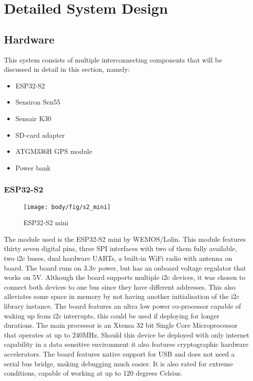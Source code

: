 \chapter{Detailed System Design}
\vspace{-2em}
\section{Hardware}


This system consists of multiple interconnecting components that will be discussed in detail in this section, namely:
\begin{itemize}
	\item ESP32-S2
	\item Sensiron Sen55
	\item Sensair K30
	\item SD-card adapter
	\item ATGM336H GPS module
	\item Power bank	
\end{itemize} 




\subsection{ESP32-S2}

\begin{figure}[!htb]
	\centering
	\texttt{[image: body/fig/s2\_mini]}
	\caption{ESP32-S2 mini}
	\label{fig:s2mini}
\end{figure}


\noindent
The module used is the ESP32-S2 mini by WEMOS/Lolin. This module features thirty seven digital pins, three SPI interfaces with two of them fully available, two i2c buses, dual hardware UARTs, a built-in WiFi radio with antenna on board. The board runs on 3.3v power, but has an onboard voltage regulator that works on 5V. Although the board supports multiple i2c devices, it was chosen to connect both devices to one bus since they have different addresses. This also alleviates some space in memory by not having another initialisation of the i2c library instance. The board features an ultra low power co-processor capable of waking up from i2c interrupts, this could be used if deploying for longer durations. The main processor is an {Xtensa\textregistered}  32 bit Single Core Microprocessor that operates at up to 240MHz. Should this device be deployed with only internet capability in a data sensitive environment it also features cryptographic hardware accelerators. The board features native support for USB and does not need a serial bus bridge, making debugging much easier. It is also rated for extreme conditions, capable of working at up to 120 degrees Celsius\cite{wemos2021s2mini}.


